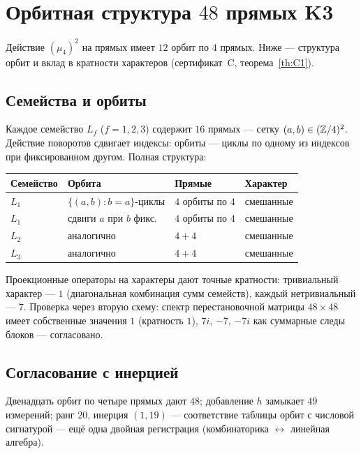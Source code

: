 
\section{Орбитная структура $48$ прямых K3}\label{app:orbits}

Действие $(\mu_4)^2$ на прямых имеет $12$ орбит по $4$ прямых.
Ниже --- структура орбит и вклад в кратности характеров
(сертификат~C, теорема~\ref{th:C1}).

\subsection{Семейства и орбиты}

Каждое семейство $L_f$ ($f=1,2,3$) содержит $16$ прямых ---
сетку $(a,b)\in(\mathbb{Z}/4)^2$. Действие поворотов сдвигает индексы:
орбиты --- циклы по одному из индексов при фиксированном другом.
Полная структура:

\begin{center}
\small
\begin{tabular}{@{}l l l l@{}}
\toprule
Семейство & Орбита & Прямые & Характер \\
\midrule
$L_1$ & $\{(a,b): b=a\}$-циклы & $4$ орбиты по $4$ &
  смешанные \\
$L_1$ & сдвиги $a$ при $b$ фикс. & $4$ орбиты по $4$ &
  смешанные \\
$L_2$ & аналогично & $4+4$ & смешанные \\
$L_3$ & аналогично & $4+4$ & смешанные \\
\bottomrule
\end{tabular}
\end{center}

Проекционные операторы на характеры дают точные кратности:
тривиальный характер --- $1$ (диагональная комбинация сумм
семейств), каждый нетривиальный --- $7$. Проверка через вторую
схему: спектр перестановочной матрицы $48\times48$ имеет
собственные значения $1$ (кратность $1$), $7i$, $-7$, $-7i$ как
суммарные следы блоков --- согласовано.

\subsection{Согласование с инерцией}

Двенадцать орбит по четыре прямых дают $48$; добавление $h$
замыкает $49$ измерений; ранг $20$, инерция $(1,19)$ ---
соответствие таблицы орбит с числовой сигнатурой --- ещё одна
двойная регистрация (комбинаторика $\leftrightarrow$ линейная
алгебра).

